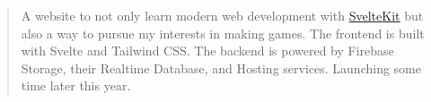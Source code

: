 \begin{cvparagraph}
\begin{quote}
\thinspace A website to not only learn modern web development with \href{https://kit.svelte.dev/}{\underline{SvelteKit}} but also a way to pursue my interests in making games. The 
frontend is built with Svelte and Tailwind CSS. The backend is powered by Firebase Storage, their Realtime Database, and Hosting services. Launching some time later this year. 
\end{quote}



\end{cvparagraph}
